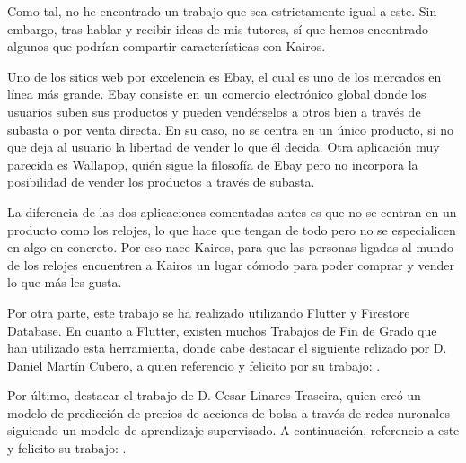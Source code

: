 
	Como tal, no he encontrado un trabajo que sea estrictamente igual a este. Sin embargo, tras hablar y recibir ideas de mis tutores, sí que hemos encontrado algunos que podrían compartir características con Kairos.
	
	Uno de los sitios web por excelencia es Ebay, el cual es uno de los mercados en línea más grande. Ebay consiste en un comercio electrónico global donde los usuarios suben sus productos y pueden vendérselos a otros bien a través de subasta o por venta directa. En su caso, no se centra en un único producto, si no que deja al usuario la libertad de vender lo que él decida. Otra aplicación muy parecida es Wallapop, quién sigue la filosofía de Ebay pero no incorpora la posibilidad de vender los productos a través de subasta.
	
	La diferencia de las dos aplicaciones comentadas antes es que no se centran en un producto como los relojes, lo que hace que tengan de todo pero no se especialicen en algo en concreto. Por eso nace Kairos, para que las personas ligadas al mundo de los relojes encuentren a Kairos un lugar cómodo para poder comprar y vender lo que más les gusta.
	
	Por otra parte, este trabajo se ha realizado utilizando Flutter y Firestore Database. En cuanto a Flutter, existen muchos Trabajos de Fin de Grado que han utilizado esta herramienta, donde cabe destacar el siguiente relizado por D. Daniel Martín Cubero, a quien referencio y felicito por su trabajo: \cite{daniel:dasell}.
	
	Por último, destacar el trabajo de D. Cesar Linares Traseira, quien creó un modelo de predicción de precios de acciones de bolsa a través de redes nuronales siguiendo un modelo de aprendizaje supervisado. A continuación, referencio a este y felicito su trabajo: \cite{cesar:modelo}.
	
	 
